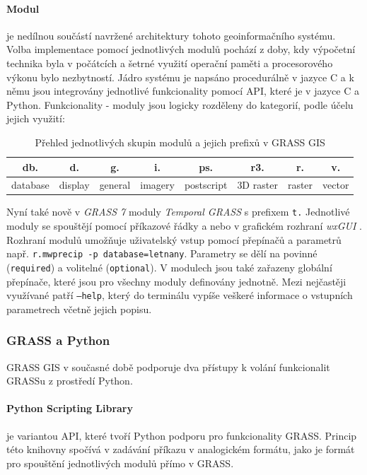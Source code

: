 \documentclass[a4paper,12pt,oneside]{report}
\begin{document}
\paragraph*{Modul} je nedílnou součástí navržené architektury tohoto
geoinformačního systému. Volba implementace pomocí jednotlivých modulů
pochází z doby, kdy výpočetní technika byla v počátcích a šetrné
využití operační paměti a procesorového výkonu bylo nezbytností. Jádro
systému je napsáno procedurálně v jazyce C a k němu jsou integrovány
jednotlivé funkcionality pomocí \acs{API}, které je v jazyce C a
Python. Funkcionality - moduly jsou logicky rozděleny do kategorií,
podle účelu jejich využití:
\begin{table}[h]
\centering
\begin{tabular}{|cccccccc|}
\hline
db. & d. & g. & i. & ps. & r3. & r. & v. \\
\hline \hline
database & display & general & imagery & postscript & 3D raster & raster & vector \\ \hline
\end{tabular}
\caption{Přehled jednotlivých skupin modulů a jejich prefixů v GRASS GIS}
\label{tab:module}
\end{table}


Nyní také nově v \textit{GRASS 7} moduly \textit{Temporal GRASS} s
prefixem \texttt{t.} Jednotlivé moduly se spouštějí pomocí příkazové
řádky a nebo v grafickém rozhraní \textit{wxGUI} . Rozhraní modulů
umožňuje uživatelský vstup pomocí přepínačů a parametrů
např. \texttt{r.mwprecip -p database=letnany}. Parametry se dělí na
povinné (\texttt{required}) a volitelné (\texttt{optional}). V
modulech jsou také zařazeny globální přepínače, které jsou pro všechny moduly
definovány jednotně. Mezi nejčastěji využívané patří \texttt{--help},
který do terminálu vypíše veškeré informace o vstupních parametrech
včetně jejich popisu.

\subsubsection*{GRASS a Python}
GRASS GIS v současné době podporuje dva přístupy k volání funkcionalit
GRASSu z prostředí Python.
\paragraph*{Python Scripting Library} je variantou API, které tvoří
Python podporu pro funkcionality GRASS. Princip této knihovny spočívá
v zadávání příkazu v analogickém formátu, jako je formát pro spouštění
jednotlivých modulů přímo v GRASS.
\end{document}
